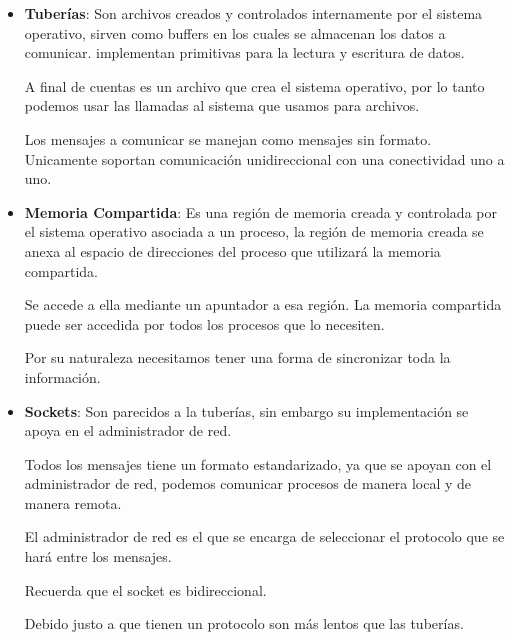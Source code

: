 \documentclass[12pt, fleqn]{report}                             %
\begin{document}
            \begin{itemize}
                \item \textbf{Tuberías}: Son archivos creados y controlados internamente por el 
                    sistema operativo, sirven como buffers en los cuales se almacenan los datos
                    a comunicar. implementan primitivas para la lectura y escritura de datos.

                    A final de cuentas es un archivo que crea el sistema operativo, por lo tanto
                    podemos usar las llamadas al sistema que usamos para archivos.

                    Los mensajes a comunicar se manejan como mensajes sin formato. Unicamente soportan
                    comunicación unidireccional con una conectividad uno a uno.

                \item \textbf{Memoria Compartida}:
                    Es una región de memoria creada y controlada por el sistema operativo asociada a un
                    proceso, la región de memoria creada se anexa al espacio de direcciones del proceso
                    que utilizará la memoria compartida.

                    Se accede a ella mediante un apuntador a esa región. La memoria compartida puede ser
                    accedida por todos los procesos que lo necesiten.

                    Por su naturaleza necesitamos tener una forma de sincronizar toda la información.

                \item \textbf{Sockets}:
                    Son parecidos a la tuberías, sin embargo su implementación se apoya en el administrador
                    de red.

                    Todos los mensajes tiene un formato estandarizado, ya que se apoyan con el administrador
                    de red, podemos comunicar procesos de manera local y de manera remota.

                    El administrador de red es el que se encarga de seleccionar el protocolo que se hará entre
                    los mensajes.

                    Recuerda que el socket es bidireccional.

                    Debido justo a que tienen un protocolo son más lentos que las tuberías.
            \end{itemize}
\end{document}

